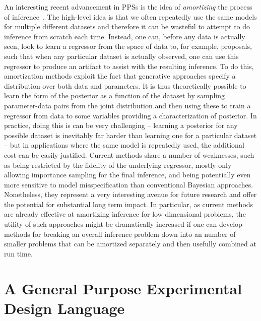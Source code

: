 An interesting recent advancement in PPSs is the idea of \emph{amortizing} the process of 
inference~\citep{paige2016inference,ritchie2016deep,le2017inference}.  The  high-level idea is that  
we often repeatedly use the same models for multiple different datasets and therefore
it can be wasteful to attempt to do inference from scratch each time.  Instead, one can, before any data is
actually seen, look to learn a regressor from the space of data to, for example, proposals, such that
when any particular dataset is actually observed, one can use this regressor to produce an
artifact to assist with the resulting inference.  To do this, amortization methods exploit the fact that generative
approaches specify a distribution over both data and parameters.  It is thus theoretically possible
to learn the form of the posterior as a function of the dataset by sampling parameter-data pairs from
the joint distribution and then using these to train a regressor from data to some variables providing a characterization of
posterior.  In practice, doing this is can be very challenging -- learning a posterior for any possible
dataset is inevitably far harder than learning one for a particular dataset -- but in applications where
the same model is repeatedly used, the additional cost can be easily justified.  Current methods share
a number of weaknesses, such as being restricted by the fidelity of the underlying regressor, mostly
only allowing importance sampling for the final inference, and being potentially even more sensitive to
model misspecification than conventional Bayesian approaches.  Nonetheless, they represent a very interesting avenue
for future research and offer the potential for substantial long term impact.  In particular, as current methods
are already effective at amortizing inference for low dimensional problems, the utility of such approaches
might be dramatically increased if one can develop methods for breaking an overall inference problem down
into an number of smaller problems that can be amortized separately and then usefully combined at run time.

\section{A General Purpose Experimental Design Language}
\label{sec:disc:design}

